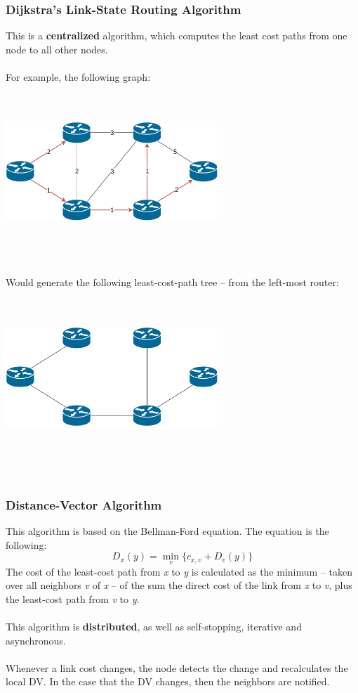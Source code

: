 \documentclass{article}
\begin{document}
\subsubsection{Dijkstra's Link-State Routing Algorithm}
This is a \textbf{centralized} algorithm, which computes the least cost paths from one node to all other nodes. \\ \\
For example, the following graph: \\ \\ \\
\centerline{\includegraphics[width=8cm]{./assets/dls_1.png}} \\ \\ \\
Would generate the following least-cost-path tree -- from the left-most router: \\ \\ \\
\centerline{\includegraphics[width=8cm]{./assets/dls_2.png}} \\ \\ \\

\subsubsection{Distance-Vector Algorithm}
This algorithm is based on the Bellman-Ford equation. The equation is the following:
\[ D_x(y) = \min_v\{ c_{x, v} + D_v(y) \} \]
The cost of the least-cost path from \textit{x} to \textit{y} is calculated as the minimum -- taken over all neighbors \textit{v} of \textit{x} -- of the sum the direct cost of the link from \textit{x} to \textit{v}, plus the least-cost path from \textit{v} to \textit{y}. \\ \\
This algorithm is \textbf{distributed}, as well as self-stopping, iterative and asynchronous. \\ \\
Whenever a link cost changes, the node detects the change and recalculates the local DV. In the case that the DV changes, then the neighbors are notified.
\end{document}
